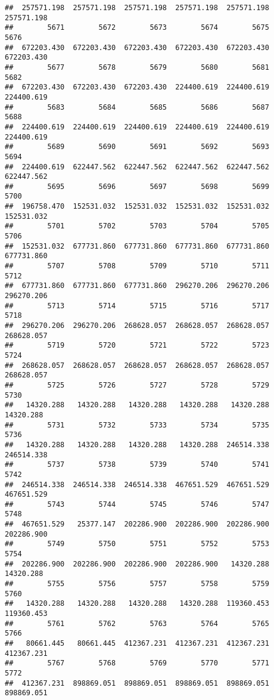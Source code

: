 \documentclass[
]{book}
\begin{document}
\begin{verbatim}
##  257571.198  257571.198  257571.198  257571.198  257571.198  257571.198 
##        5671        5672        5673        5674        5675        5676 
##  672203.430  672203.430  672203.430  672203.430  672203.430  672203.430 
##        5677        5678        5679        5680        5681        5682 
##  672203.430  672203.430  672203.430  224400.619  224400.619  224400.619 
##        5683        5684        5685        5686        5687        5688 
##  224400.619  224400.619  224400.619  224400.619  224400.619  224400.619 
##        5689        5690        5691        5692        5693        5694 
##  224400.619  622447.562  622447.562  622447.562  622447.562  622447.562 
##        5695        5696        5697        5698        5699        5700 
##  196758.470  152531.032  152531.032  152531.032  152531.032  152531.032 
##        5701        5702        5703        5704        5705        5706 
##  152531.032  677731.860  677731.860  677731.860  677731.860  677731.860 
##        5707        5708        5709        5710        5711        5712 
##  677731.860  677731.860  677731.860  296270.206  296270.206  296270.206 
##        5713        5714        5715        5716        5717        5718 
##  296270.206  296270.206  268628.057  268628.057  268628.057  268628.057 
##        5719        5720        5721        5722        5723        5724 
##  268628.057  268628.057  268628.057  268628.057  268628.057  268628.057 
##        5725        5726        5727        5728        5729        5730 
##   14320.288   14320.288   14320.288   14320.288   14320.288   14320.288 
##        5731        5732        5733        5734        5735        5736 
##   14320.288   14320.288   14320.288   14320.288  246514.338  246514.338 
##        5737        5738        5739        5740        5741        5742 
##  246514.338  246514.338  246514.338  467651.529  467651.529  467651.529 
##        5743        5744        5745        5746        5747        5748 
##  467651.529   25377.147  202286.900  202286.900  202286.900  202286.900 
##        5749        5750        5751        5752        5753        5754 
##  202286.900  202286.900  202286.900  202286.900   14320.288   14320.288 
##        5755        5756        5757        5758        5759        5760 
##   14320.288   14320.288   14320.288   14320.288  119360.453  119360.453 
##        5761        5762        5763        5764        5765        5766 
##   80661.445   80661.445  412367.231  412367.231  412367.231  412367.231 
##        5767        5768        5769        5770        5771        5772 
##  412367.231  898869.051  898869.051  898869.051  898869.051  898869.051 

\end{verbatim}
\end{document}
